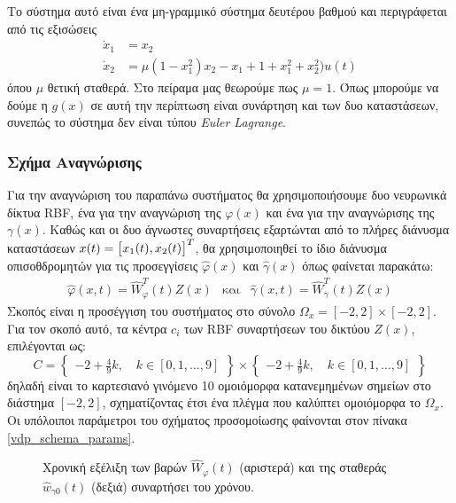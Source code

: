 Το σύστημα αυτό είναι ένα μη-γραμμικό σύστημα δευτέρου βαθμού και περιγράφεται από τις εξισώσεις
\begin{equation}
\begin{split}
\dot{x}_1 &= x_2 \\
\dot{x}_2 &= \mu (1-x_1^2)x_2 - x_1 + 1+x_1^2+x_2^2)u(t)
\end{split}
\end{equation}
όπου $\mu$ θετική σταθερά. Στο πείραμα μας θεωρούμε πως $\mu = 1$. Όπως μπορούμε να δούμε η $g(x)$ σε αυτή την περίπτωση είναι συνάρτηση και των δυο καταστάσεων, συνεπώς το σύστημα δεν είναι τύπου \textit{Euler Lagrange}.

\subsubsection{Σχήμα Αναγνώρισης}
Για την αναγνώριση του παραπάνω συστήματος θα χρησιμοποιήσουμε δυο νευρωνικά δίκτυα RBF, ένα για την αναγνώριση της $\varphi(x)$ και ένα για την αναγνώρισης της  $\gamma(x)$. Καθώς και οι δυο άγνωστες συναρτήσεις εξαρτώνται από το πλήρες διάνυσμα καταστάσεων $x(t) =\bmqty{x_1(t),x_2(t)}^T$, θα χρησιμοποιηθεί το ίδιο διάνυσμα οπισοθδρομητών για τις προσεγγίσεις $\hat{\varphi}(x)$ και $\hat{\gamma}(x)$ όπως φαίνεται παρακάτω:
\begin{equation*}
\begin{matrix}
\hat{\varphi}(x,t)  = \hat{W}_{\varphi}^T(t) Z(x) & \text{και} & \hat{\gamma}(x,t) = \hat{W}_{\gamma}^T(t) Z(x) 
\end{matrix}
\end{equation*}
Σκοπός είναι η προσέγγιση του συστήματος στο σύνολο $\Omega_x = [-2,2] \times [-2,2] $. Για τον σκοπό αυτό, τα κέντρα $c_i$ των RBF συναρτήσεων του δικτύου $Z(x)$, επιλέγονται ως:
\begin{equation*}
	C = \begin{Bmatrix}
	-2 +  \frac{4}{9}k, \quad  k \in [0,1,...,9]
	\end{Bmatrix} \times
	\begin{Bmatrix}
	-2 +  \frac{4}{9}k, \quad  k \in [0,1,...,9]
	\end{Bmatrix}
\end{equation*}
δηλαδή είναι το καρτεσιανό γινόμενο 10 ομοιόμορφα κατανεμημένων σημείων στο διάστημα $[-2,2]$, σχηματίζοντας έτσι ένα πλέγμα που καλύπτει ομοιόμορφα το $\Omega_x$. Οι υπόλοιποι παράμετροι του σχήματος προσομοίωσης φαίνονται στον πίνακα \ref{vdp_schema_params}.

\begin{figure}
	\begin{subfigure}{0.5\textwidth}
		
	\end{subfigure}
	\begin{subfigure}{0.5\textwidth}
		
	\end{subfigure}
	\caption{ Χρονική εξέλιξη των βαρών $\hat{W}_\varphi(t)$ (αριστερά) και της σταθεράς $\hat{w}_{\gamma 0}(t)$ (δεξιά) συναρτήσει του χρόνου.}
	\label{fig:vdp_weights}
\end{figure}

